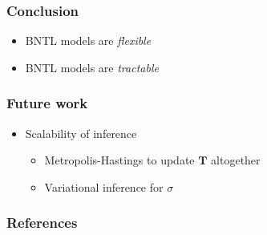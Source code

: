 \documentclass[final,hyperref={pdfpagelabels=false},noamsthm]{beamer}
\newcommand{\bfT}{\mathbf{T}}
\begin{document}
\begin{frame}
	\frametitle{Conclusion}
	\begin{itemize}
		\item BNTL models are \textit{flexible}
		\item BNTL models are \textit{tractable}
	\end{itemize}
\end{frame}

\begin{frame}
	\frametitle{Future work}
	\begin{itemize}
		\item Scalability of inference
		\begin{itemize}
			\item Metropolis-Hastings to update $\bfT$ altogether
			\item Variational inference for $\sigma$
		\end{itemize}
	\end{itemize}
\end{frame}

\begin{frame}
	\frametitle{References}
	\tiny{
	}
\end{frame}
\end{document}
